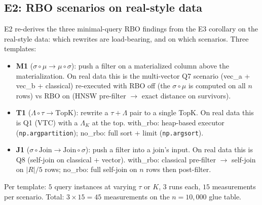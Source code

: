 \documentclass[sigconf,nonacm,review]{acmart}
\theoremstyle{plain}
\theoremstyle{definition}
\theoremstyle{remark}
\begin{document}
\subsection{E2: RBO scenarios on real-style data}\label{sec:eval:e2}

E2 re-derives the three minimal-query RBO findings from the
E3 corollary on the real-style data: which rewrites are
load-bearing, and on which scenarios.  Three templates:

\begin{itemize}[leftmargin=*, itemsep=1pt]
  \item \textbf{M1} ($\sigma \circ \mu \to \mu \circ \sigma$):
    push a filter on a materialized column above the
    materialization.  On real data this is the
    multi-vector Q7 scenario (vec\_a + vec\_b + classical)
    re-executed with RBO off (the $\sigma \circ \mu$ is
    computed on all $n$ rows) vs RBO on (HNSW pre-filter
    $\to$ exact distance on survivors).
  \item \textbf{T1} ($\Lambda \circ \tau \to \mathrm{TopK}$):
    rewrite a $\tau + \Lambda$ pair to a single TopK.
    On real data this is Q1 (VTC) with a $\Lambda_K$ at the top.
    with\_rbo: heap-based executor
    (\texttt{np.argpartition}); no\_rbo: full sort + limit
    (\texttt{np.argsort}).
  \item \textbf{J1} ($\sigma \circ \mathrm{Join} \to \mathrm{Join}
    \circ \sigma$): push a filter into a join's input.  On real
    data this is Q8 (self-join on classical + vector).
    with\_rbo: classical pre-filter $\to$ self-join on
    $|R|/5$ rows; no\_rbo: full self-join on $n$ rows then
    post-filter.
\end{itemize}

\noindent Per template: $5$ query instances at varying
$\tau$ or $K$, $3$ runs each, $15$ measurements per scenario.
Total: $3 \times 15 = 45$ measurements on the $n = 10{,}000$
glue table.
\end{document}
